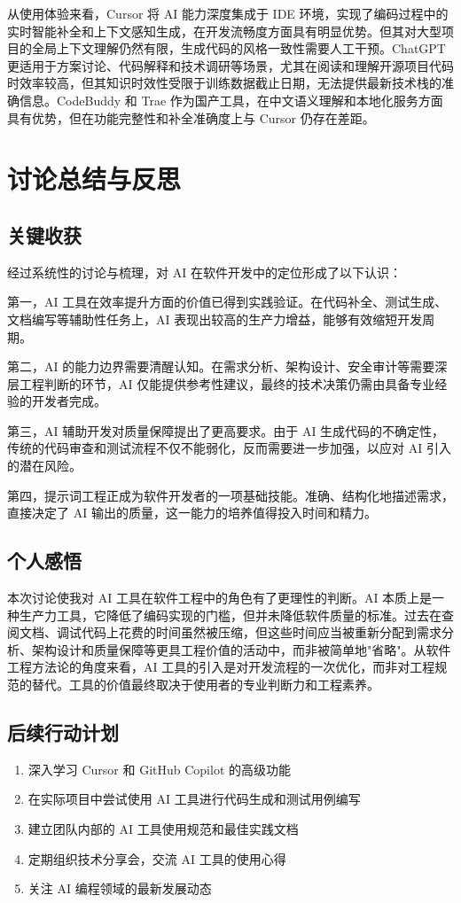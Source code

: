 \documentclass[12pt,a4paper]{article}
\begin{document}
从使用体验来看，Cursor 将 AI 能力深度集成于 IDE 环境，实现了编码过程中的实时智能补全和上下文感知生成，在开发流畅度方面具有明显优势。但其对大型项目的全局上下文理解仍然有限，生成代码的风格一致性需要人工干预。ChatGPT 更适用于方案讨论、代码解释和技术调研等场景，尤其在阅读和理解开源项目代码时效率较高，但其知识时效性受限于训练数据截止日期，无法提供最新技术栈的准确信息。CodeBuddy 和 Trae 作为国产工具，在中文语义理解和本地化服务方面具有优势，但在功能完整性和补全准确度上与 Cursor 仍存在差距。

\section{讨论总结与反思}

\subsection{关键收获}

经过系统性的讨论与梳理，对 AI 在软件开发中的定位形成了以下认识：

第一，AI 工具在效率提升方面的价值已得到实践验证。在代码补全、测试生成、文档编写等辅助性任务上，AI 表现出较高的生产力增益，能够有效缩短开发周期。

第二，AI 的能力边界需要清醒认知。在需求分析、架构设计、安全审计等需要深层工程判断的环节，AI 仅能提供参考性建议，最终的技术决策仍需由具备专业经验的开发者完成。

第三，AI 辅助开发对质量保障提出了更高要求。由于 AI 生成代码的不确定性，传统的代码审查和测试流程不仅不能弱化，反而需要进一步加强，以应对 AI 引入的潜在风险。

第四，提示词工程正成为软件开发者的一项基础技能。准确、结构化地描述需求，直接决定了 AI 输出的质量，这一能力的培养值得投入时间和精力。

\subsection{个人感悟}

本次讨论使我对 AI 工具在软件工程中的角色有了更理性的判断。AI 本质上是一种生产力工具，它降低了编码实现的门槛，但并未降低软件质量的标准。过去在查阅文档、调试代码上花费的时间虽然被压缩，但这些时间应当被重新分配到需求分析、架构设计和质量保障等更具工程价值的活动中，而非被简单地"省略"。从软件工程方法论的角度来看，AI 工具的引入是对开发流程的一次优化，而非对工程规范的替代。工具的价值最终取决于使用者的专业判断力和工程素养。

\subsection{后续行动计划}
\begin{enumerate}[label=\arabic*.]
    \item 深入学习 Cursor 和 GitHub Copilot 的高级功能
    \item 在实际项目中尝试使用 AI 工具进行代码生成和测试用例编写
    \item 建立团队内部的 AI 工具使用规范和最佳实践文档
    \item 定期组织技术分享会，交流 AI 工具的使用心得
    \item 关注 AI 编程领域的最新发展动态
\end{enumerate}
\end{document}
